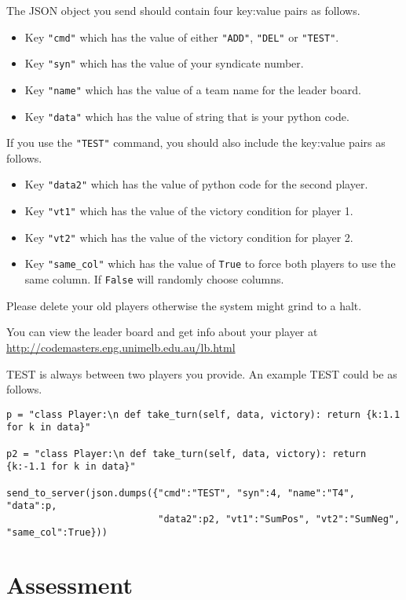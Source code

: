 \documentclass{article}
\begin{document}
The JSON object you send should contain four key:value pairs as follows.
\begin{itemize}
\item Key {\tt "cmd"} which has the value of either {\tt "ADD"}, {\tt "DEL"} or {\tt "TEST"}.
\item Key {\tt "syn"} which has the value of your syndicate number.
\item Key {\tt "name"} which has the value of a team name for the leader board.
\item Key {\tt "data"} which has the value of string that is your python code.
\end{itemize}
If you use the {\tt "TEST"} command, you should also include the key:value pairs as follows.
\begin{itemize}
\item Key {\tt "data2"} which has the value of python code for the second player.
\item Key {\tt "vt1"} which has the value of the victory condition for player 1.
\item Key {\tt "vt2"} which has the value of the victory condition for player 2.
\item Key {\tt "same\_col"} which has the value of {\tt True} to force both players to use the same column. 
                            If {\tt False} will randomly choose columns.
\end{itemize}

Please delete your old players otherwise the system might grind to a halt.

You can view the leader board and get info about your player at 
\url{http://codemasters.eng.unimelb.edu.au/lb.html}

TEST is always between two players you provide.
An example TEST could be as follows.
\begin{verbatim}
p = "class Player:\n def take_turn(self, data, victory): return {k:1.1 for k in data}"

p2 = "class Player:\n def take_turn(self, data, victory): return {k:-1.1 for k in data}"

send_to_server(json.dumps({"cmd":"TEST", "syn":4, "name":"T4", "data":p, 
                           "data2":p2, "vt1":"SumPos", "vt2":"SumNeg", "same_col":True}))
\end{verbatim}

\section{Assessment}
\end{document}
